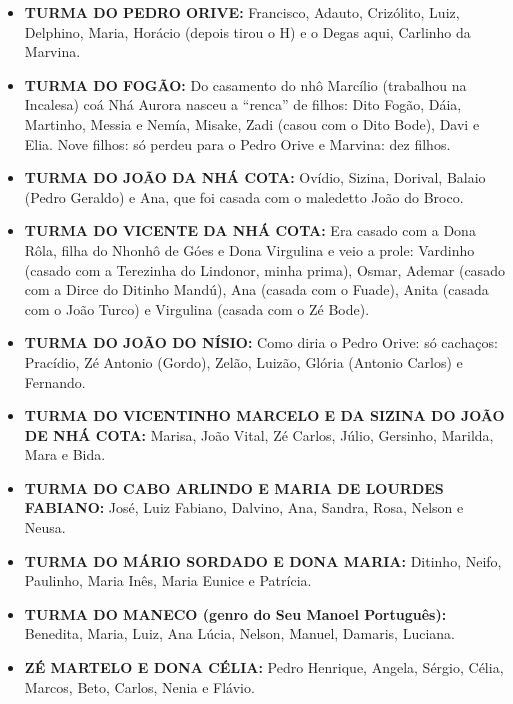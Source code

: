 \documentclass[12pt,brazil,]{book}
\providecommand{\tightlist}{%
  \setlength{\itemsep}{0pt}\setlength{\parskip}{0pt}}
\begin{document}
\begin{itemize}
\tightlist
\item
  \textbf{TURMA DO PEDRO ORIVE:} Francisco, Adauto, Crizólito, Luiz,
  Delphino, Maria, Horácio (depois tirou o H) e o Degas aqui, Carlinho
  da Marvina.\\
\item
  \textbf{TURMA DO FOGÃO:} Do casamento do nhô Marcílio (trabalhou na
  Incalesa) coá Nhá Aurora nasceu a ``renca'' de filhos: Dito Fogão,
  Dáia, Martinho, Messia e Nemía, Misake, Zadi (casou com o Dito Bode),
  Davi e Elia. Nove filhos: só perdeu para o Pedro Orive e Marvina: dez
  filhos.
\item
  \textbf{TURMA DO JOÃO DA NHÁ COTA:} Ovídio, Sizina, Dorival, Balaio
  (Pedro Geraldo) e Ana, que foi casada com o maledetto João do Broco.
\item
  \textbf{TURMA DO VICENTE DA NHÁ COTA:} Era casado com a Dona Rôla,
  filha do Nhonhô de Góes e Dona Virgulina e veio a prole: Vardinho
  (casado com a Terezinha do Lindonor, minha prima), Osmar, Ademar
  (casado com a Dirce do Ditinho Mandú), Ana (casada com o Fuade), Anita
  (casada com o João Turco) e Virgulina (casada com o Zé Bode).
\item
  \textbf{TURMA DO JOÃO DO NÍSIO:} Como diria o Pedro Orive: só
  cachaços: Pracídio, Zé Antonio (Gordo), Zelão, Luizão, Glória (Antonio
  Carlos) e Fernando.
\item
  \textbf{TURMA DO VICENTINHO MARCELO E DA SIZINA DO JOÃO DE NHÁ COTA:}
  Marisa, João Vital, Zé Carlos, Júlio, Gersinho, Marilda, Mara e Bida.
\item
  \textbf{TURMA DO CABO ARLINDO E MARIA DE LOURDES FABIANO:} José, Luiz
  Fabiano, Dalvino, Ana, Sandra, Rosa, Nelson e Neusa.
\item
  \textbf{TURMA DO MÁRIO SORDADO E DONA MARIA:} Ditinho, Neifo,
  Paulinho, Maria Inês, Maria Eunice e Patrícia.
\item
  \textbf{TURMA DO MANECO (genro do Seu Manoel Português):} Benedita,
  Maria, Luiz, Ana Lúcia, Nelson, Manuel, Damaris, Luciana.
\item
  \textbf{ZÉ MARTELO E DONA CÉLIA:} Pedro Henrique, Angela, Sérgio,
  Célia, Marcos, Beto, Carlos, Nenia e Flávio.
\end{itemize}
\end{document}
